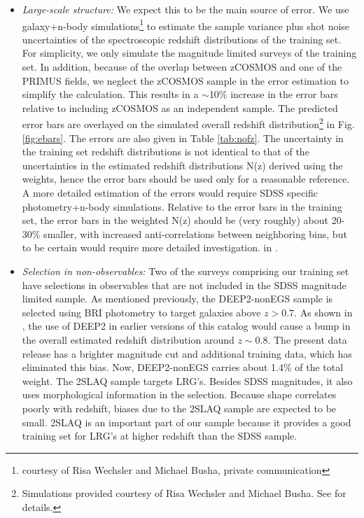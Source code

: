 \documentclass[preprint]{aastex}
\begin{document}
\begin{itemize}

\item {\it Large-scale structure: } We expect this to be the main source of
error.  We use galaxy+n-body simulations\footnote{courtesy of Risa Wechsler and
Michael Busha, private communication} to estimate the sample variance plus shot
noise uncertainties of the spectroscopic redshift distributions of the training
set.  For simplicity, we only simulate the magnitude limited surveys of the
training set.  In addition, because of the overlap between zCOSMOS and one of
the PRIMUS fields, we neglect the zCOSMOS sample in the error estimation to
simplify the calculation.  This results in a $\sim$10\% increase in the error
bars relative to including zCOSMOS as an independent sample.  The predicted
error bars are overlayed on the simulated overall redshift
distribution\footnote{Simulations provided courtesy of Risa Wechsler and
Michael Busha. See \cite{bushasimulations} for details.} in Fig.
\ref{fig:ebars}.  The errors are also given in Table \ref{tab:nofz}. The
uncertainty in the training set redshift distributions is not identical to that
of the uncertainties in the estimated redshift distributions N(z) derived using
the weights, hence the error bars should be used only for a reasonable
reference.  A more detailed estimation of the errors would require SDSS
specific photometry+n-body simulations.  Relative to the error bars in the
training set, the error bars in the weighted N(z) should be (very roughly)
about 20-30\% smaller, with increased anti-correlations between neighboring
bins, but to be certain would require more detailed investigation.
in \citet{CunhaPhotozLSS11}.


\item {\it Selection in non-observables: } Two of the surveys comprising our
training set have selections in observables that are not included in the SDSS
magnitude limited sample.  As mentioned previously, the DEEP2-nonEGS sample is
selected using BRI photometry to target galaxies above $z>0.7$.  As shown in
\citet{CunhaPhotoz09}, the use of DEEP2 in earlier versions of this catalog
would cause a bump in the overall estimated redshift distribution around $z\sim
0.8$.  The present data release has a brighter magnitude cut and additional
training data, which has eliminated this bias.  
Now, DEEP2-nonEGS carries about 1.4\% of the total weight.  The 2SLAQ sample targets
LRG's.  Besides SDSS magnitudes, it also uses morphological information in the
selection.  Because shape correlates poorly with redshift, biases due to the
2SLAQ sample are expected to be small.  2SLAQ is an important part of our
sample because it provides a good training set for LRG's at higher redshift
than the SDSS sample.


\end{itemize}
\end{document}

